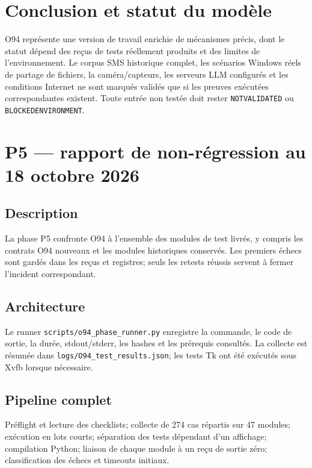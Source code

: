 \documentclass[11pt,a4paper]{article}
\begin{document}
\section{Conclusion et statut du modèle}
O94 représente une version de travail enrichie de mécanismes précis, dont le statut dépend des reçus de tests réellement produits et des limites de l'environnement. Le corpus SMS historique complet, les scénarios Windows réels de partage de fichiers, la caméra/capteurs, les serveurs LLM configurés et les conditions Internet ne sont marqués validés que si les preuves exécutées correspondantes existent. Toute entrée non testée doit rester \texttt{NOT\textunderscore VALIDATED} ou \texttt{BLOCKED\textunderscore ENVIRONMENT}.

\section{P5 — rapport de non-régression au 18 octobre 2026}
\subsection{Description}
La phase P5 confronte O94 à l’ensemble des modules de test livrés, y compris les contrats O94 nouveaux et les modules historiques conservés. Les premiers échecs sont gardés dans les reçus et registres; seuls les retests réussis servent à fermer l’incident correspondant.
\subsection{Architecture}
Le runner \texttt{scripts/o94\_phase\_runner.py} enregistre la commande, le code de sortie, la durée, stdout/stderr, les hashes et les prérequis consultés. La collecte est résumée dans \texttt{logs/O94\_test\_results.json}; les tests Tk ont été exécutés sous Xvfb lorsque nécessaire.
\subsection{Pipeline complet}
Préflight et lecture des checklists; collecte de 274 cas répartis sur 47 modules; exécution en lots courts; séparation des tests dépendant d’un affichage; compilation Python; liaison de chaque module à un reçu de sortie zéro; classification des échecs et timeouts initiaux.
\end{document}
